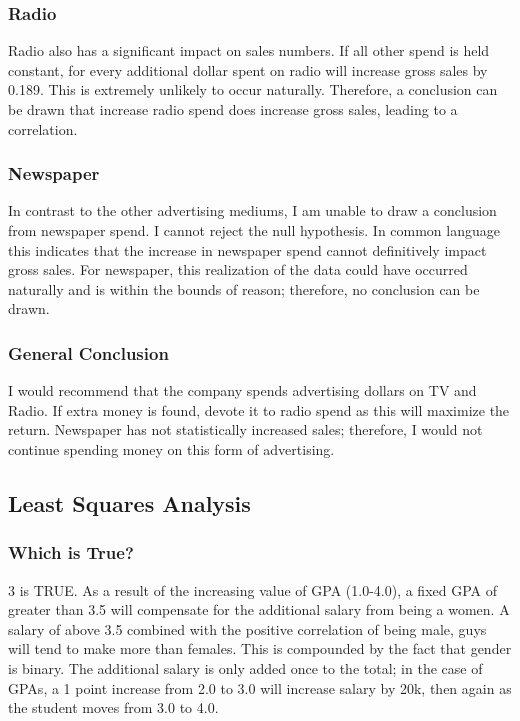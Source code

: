 \documentclass[11pt]{article}
\begin{document}
\subsubsection{Radio}\label{radio}

Radio also has a significant impact on sales numbers. If all other spend
is held constant, for every additional dollar spent on radio will
increase gross sales by 0.189. This is extremely unlikely to occur
naturally. Therefore, a conclusion can be drawn that increase radio
spend does increase gross sales, leading to a correlation.

\subsubsection{Newspaper}\label{newspaper}

In contrast to the other advertising mediums, I am unable to draw a
conclusion from newspaper spend. I cannot reject the null hypothesis. In
common language this indicates that the increase in newspaper spend
cannot definitively impact gross sales. For newspaper, this realization
of the data could have occurred naturally and is within the bounds of
reason; therefore, no conclusion can be drawn.

\subsubsection{General Conclusion}\label{general-conclusion}

I would recommend that the company spends advertising dollars on TV and
Radio. If extra money is found, devote it to radio spend as this will
maximize the return. Newspaper has not statistically increased sales;
therefore, I would not continue spending money on this form of
advertising.

    \subsection{Least Squares Analysis}\label{least-squares-analysis}

    \subsubsection{Which is True?}\label{which-is-true}

3 is TRUE. As a result of the increasing value of GPA (1.0-4.0), a fixed
GPA of greater than 3.5 will compensate for the additional salary from
being a women. A salary of above 3.5 combined with the positive
correlation of being male, guys will tend to make more than females.
This is compounded by the fact that gender is binary. The additional
salary is only added once to the total; in the case of GPAs, a 1 point
increase from 2.0 to 3.0 will increase salary by 20k, then again as the
student moves from 3.0 to 4.0.
\end{document}
